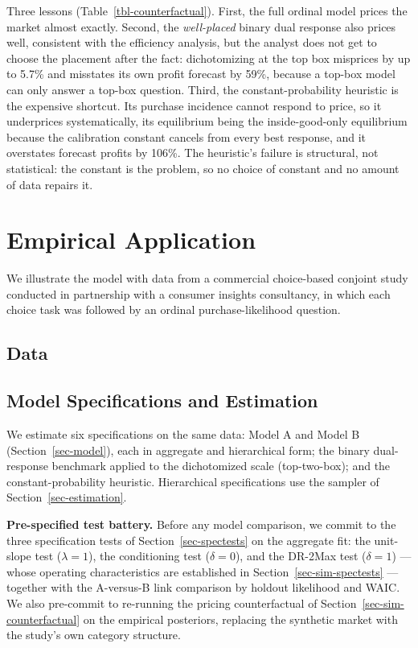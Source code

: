 \documentclass[
  letterpaper,
  DIV=11,
  numbers=noendperiod]{scrartcl}
\theoremstyle{plain}
\theoremstyle{plain}
\theoremstyle{remark}
\begin{document}
Three lessons (Table~\ref{tbl-counterfactual}). First, the full ordinal
model prices the market almost exactly. Second, the \emph{well-placed}
binary dual response also prices well, consistent with the efficiency
analysis, but the analyst does not get to choose the placement after the
fact: dichotomizing at the top box misprices by up to 5.7\% and
misstates its own profit forecast by 59\%, because a top-box model can
only answer a top-box question. Third, the constant-probability
heuristic is the expensive shortcut. Its purchase incidence cannot
respond to price, so it underprices systematically, its equilibrium
being the inside-good-only equilibrium because the calibration constant
cancels from every best response, and it overstates forecast profits by
106\%. The heuristic's failure is structural, not statistical: the
constant is the problem, so no choice of constant and no amount of data
repairs it.

\section{Empirical Application}\label{sec-analysis}

We illustrate the model with data from a commercial choice-based
conjoint study conducted in partnership with a consumer insights
consultancy, in which each choice task was followed by an ordinal
purchase-likelihood question.

\subsection{Data}\label{sec-data}

\subsection{Model Specifications and
Estimation}\label{sec-empirical-spec}

We estimate six specifications on the same data: Model A and Model B
(Section~\ref{sec-model}), each in aggregate and hierarchical form; the
binary dual-response benchmark applied to the dichotomized scale
(top-two-box); and the constant-probability heuristic. Hierarchical
specifications use the sampler of Section~\ref{sec-estimation}.

\textbf{Pre-specified test battery.} Before any model comparison, we
commit to the three specification tests of Section~\ref{sec-spectests}
on the aggregate fit: the unit-slope test (\(\lambda = 1\)), the
conditioning test (\(\delta = 0\)), and the DR-2Max test
(\(\delta = 1\)) --- whose operating characteristics are established in
Section~\ref{sec-sim-spectests} --- together with the A-versus-B link
comparison by holdout likelihood and WAIC. We also pre-commit to
re-running the pricing counterfactual of
Section~\ref{sec-sim-counterfactual} on the empirical posteriors,
replacing the synthetic market with the study's own category structure.
\end{document}
